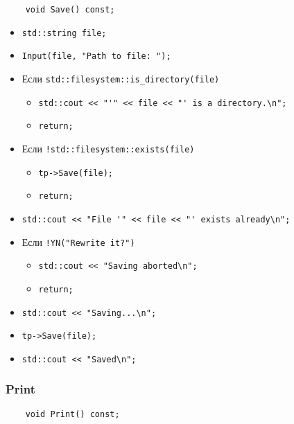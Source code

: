 \begin{lstlisting}
	void Save() const;
\end{lstlisting}

\begin{itemize}
	\item \verb|std::string file;|
    \item \verb|Input(file, "Path to file: ");|
	\item Если \verb|std::filesystem::is_directory(file)|
		\begin{itemize}
			\item \verb|std::cout << "'" << file << "' is a directory.\n";|
			\item \verb|return;|
		\end{itemize}
	\item Если \verb|!std::filesystem::exists(file)|
		\begin{itemize}
			\item \verb|tp->Save(file);|
			\item \verb|return;|
		\end{itemize}
    \item \verb|std::cout << "File '" << file << "' exists already\n";|
	\item Если \verb|!YN("Rewrite it?")|
		\begin{itemize}
			\item \verb|std::cout << "Saving aborted\n";|
			\item \verb|return;|
		\end{itemize}
    \item \verb|std::cout << "Saving...\n";|
    \item \verb|tp->Save(file);|
    \item \verb|std::cout << "Saved\n";|
\end{itemize}


\subsubsection*{Print}

\begin{lstlisting}
	void Print() const;
\end{lstlisting}

